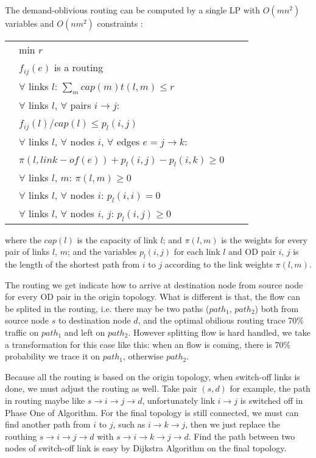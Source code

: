 \documentclass[conference]{IEEEtran}
\begin{document}
The demand-oblivious routing can be computed by a single LP with $O(mn^2)$ variables and $O(nm^2)$ constraints :
\begin{table}[!th]
\begin{tabular}{lll}
    $\:\:$\quad\quad\ min $r$ \\
    $\:\:$\quad\quad\ $f_{ij}(e)$ is a routing \\
    $\:\:$\quad\quad\ $\forall$ links $l$: $\sum_m cap(m)t(l,m) \le r$ \\
    $\:\:$\quad\quad\ $\forall$ links $l$, $\forall$ pairs $i \rightarrow j$: \\
    $\:\:$\quad\quad\quad\quad\ $f_{ij}(l)/cap(l) \le p_l(i,j)$ \\ 
    $\:\:$\quad\quad\ $\forall$ links $l$, $\forall$ nodes $i$, $\forall$ edges $e = j \rightarrow k$: \\
    $\:\:$\quad\quad\quad\quad\ $\pi(l, link-of(e)) + p_l(i,j) - p_l(i,k) \ge 0$ \\
    $\:\:$\quad\quad\ $\forall$ links $l$, $m$: $\pi(l, m) \ge 0$ \\
    $\:\:$\quad\quad\ $\forall$ links $l$, $\forall$ nodes $i$: $p_l(i,i) = 0$ \\
    $\:\:$\quad\quad\ $\forall$ links $l$, $\forall$ nodes $i$, $j$: $p_l(i,j) \ge 0$ \\
\end{tabular}
\end{table}


where the $cap(l)$ is the capacity of link $l$; 
and $\pi(l,m)$ is the weights for every pair of links $l$, $m$; and the variables $p_l(i,j)$ for each link $l$ 
and OD pair $i$, $j$ is the length of the shortest path from $i$ to $j$ according to the link weights $\pi(l, m)$.


The routing we get indicate how to arrive at destination node from source node for every OD pair in the origin topology.
What is different is that, the flow can be splited in the routing, i.e. there may be two paths ($path_1$, $path_2$)
both from source node $s$ to destination node $d$, and the optimal obilious routing trace 70\% traffic on 
$path_1$ and left on $path_2$. However splitting flow is hard handled, we take a transformation for this case like this:
when an flow is coming, there is 70\% probability we trace it on $path_1$, otherwise $path_2$.


Because all the routing is based on the origin topology, when switch-off links is done, we must adjust the routing 
as well. Take pair $(s, d)$ for example, the path in routing maybe like $s \rightarrow i \rightarrow j \rightarrow d$,
unfortunately link $i \rightarrow j$ is switched off in Phase One of Algorithm. For the final topology is still 
connected, we must can find another path from $i$ to $j$, such as $i \rightarrow k \rightarrow j$,
then we just replace the routhing $s \rightarrow i \rightarrow j \rightarrow d$ with
$s \rightarrow i \rightarrow k \rightarrow j \rightarrow d$.
Find the path between two nodes of switch-off link is easy by Dijkstra Algorithm on the final topology.
\end{document}

